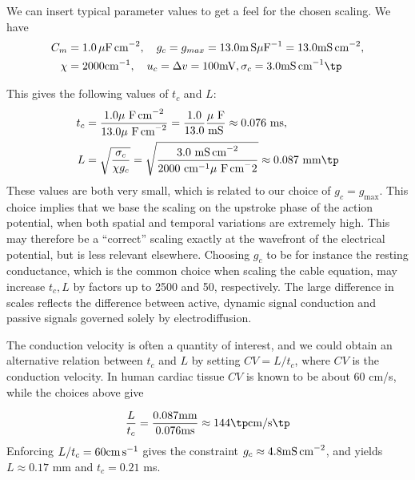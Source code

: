 \documentclass[graybox,envcountchap,sectrefs,final]{svmonodo}
\begin{document}
We can insert typical parameter values to get a feel for the
chosen scaling. We have
\begin{align*}
C_m &= 1.0\, \mu\hbox{F\,cm}^{-2}, \quad g_c = g_{max} = 13.0
\hbox{m\,S}\mu\hbox{F}^{-1} = 13.0 \hbox{mS\,cm}^{-2}, \\ 
\chi &= 2000 \hbox{cm}^{-1} , \quad u_c = \Delta v = 100 \hbox{mV} ,
\sigma_c = 3.0 \hbox{mS\,cm}^{-1}\tp
\end{align*}

This gives the following values of $t_c$ and $L$:
\begin{align*}
t_c &= \frac{1.0 \mu\hbox{ F\,cm}^{-2}}{13.0 \mu\hbox{ F\,cm}^{-2}} =
\frac{1.0}{13.0}\frac{\mu\hbox{ F}}{\hbox{mS}} \approx 0.076 \hbox{ ms}, \\ 
L &= \sqrt{\frac{\sigma_c}{\chi g_c}} = \sqrt{\frac{3.0
\hbox{ mS\,cm}^{-2}}{2000\hbox{ cm}^{-1} \mu\hbox{ F\,cm}^-2}}
\approx 0.087 \hbox{ mm} \tp
\end{align*}
These values are both very small, which is related to our
choice of $g_c = g_{\max}$. This choice implies that we base the
scaling on the upstroke phase of the action potential, when both
spatial and temporal variations are extremely high. This may therefore
be a ``correct'' scaling exactly at the wavefront of the electrical
potential, but is less relevant elsewhere. Choosing $g_c$ to be for
instance the resting conductance, which is the common choice when
scaling the cable equation, may increase $t_c, L$ by factors up to 2500 and
50, respectively. The large difference in scales reflects the
difference between active, dynamic signal conduction and passive
signals governed solely by electrodiffusion.

The conduction velocity is often a quantity of interest, and we could
obtain an alternative relation between $t_c$ and $L$ by setting
$CV = L/t_c$, where $CV$ is the conduction velocity.
In human cardiac tissue $CV$ is known to be about
60 cm/s, while the choices above give

\[
\frac{L}{t_c} =  \frac{0.087\rm{mm}}{0.076\rm{ms}} \approx 144 \tp
\hbox{cm/s}\tp \]
Enforcing $L/t_c = 60 \hbox{cm\,s}^{-1}$ gives the constraint $g_c \approx
4.8 \hbox{mS\,cm}^{-2}$, and yields $L \approx 0.17$ mm and
$t_c=0.21$ ms.
\end{document}
